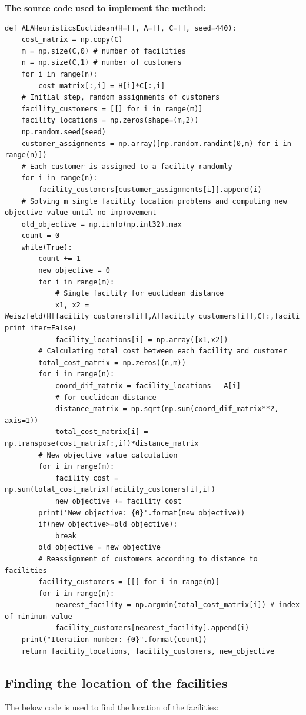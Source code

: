 \documentclass[12pt]{article}
\begin{document}
\textbf{The source code used to implement the method:}
\begin{lstlisting}[style=pythonstyle]
def ALAHeuristicsEuclidean(H=[], A=[], C=[], seed=440): 
    cost_matrix = np.copy(C)
    m = np.size(C,0) # number of facilities
    n = np.size(C,1) # number of customers
    for i in range(n):
        cost_matrix[:,i] = H[i]*C[:,i]
    # Initial step, random assignments of customers
    facility_customers = [[] for i in range(m)]
    facility_locations = np.zeros(shape=(m,2))
    np.random.seed(seed)
    customer_assignments = np.array([np.random.randint(0,m) for i in range(n)])
    # Each customer is assigned to a facility randomly
    for i in range(n):
        facility_customers[customer_assignments[i]].append(i)
    # Solving m single facility location problems and computing new objective value until no improvement
    old_objective = np.iinfo(np.int32).max
    count = 0
    while(True):
        count += 1
        new_objective = 0
        for i in range(m):
            # Single facility for euclidean distance
            x1, x2 = Weiszfeld(H[facility_customers[i]],A[facility_customers[i]],C[:,facility_customers[i]],i, print_iter=False)
            facility_locations[i] = np.array([x1,x2])
        # Calculating total cost between each facility and customer
        total_cost_matrix = np.zeros((n,m))
        for i in range(n):
            coord_dif_matrix = facility_locations - A[i]
            # for euclidean distance
            distance_matrix = np.sqrt(np.sum(coord_dif_matrix**2, axis=1))
            total_cost_matrix[i] = np.transpose(cost_matrix[:,i])*distance_matrix
        # New objective value calculation
        for i in range(m):
            facility_cost = np.sum(total_cost_matrix[facility_customers[i],i])
            new_objective += facility_cost
        print('New objective: {0}'.format(new_objective))    
        if(new_objective>=old_objective):
            break
        old_objective = new_objective
        # Reassignment of customers according to distance to facilities
        facility_customers = [[] for i in range(m)]
        for i in range(n):
            nearest_facility = np.argmin(total_cost_matrix[i]) # index of minimum value
            facility_customers[nearest_facility].append(i)   
    print("Iteration number: {0}".format(count))    
    return facility_locations, facility_customers, new_objective
\end{lstlisting}

\subsection{Finding the location of the facilities}
The below code is used to find the location of the facilities:
\end{document}
